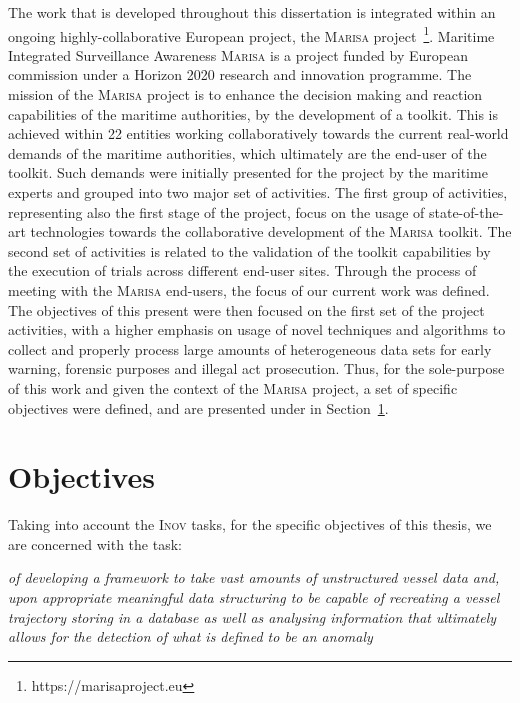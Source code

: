 The work that is developed throughout this dissertation  is integrated within an ongoing highly-collaborative European project, the \textsc{Marisa} project~\footnote{https://marisaproject.eu}. Maritime Integrated Surveillance Awareness \textsc{Marisa} is a project funded by European commission under a Horizon 2020 research and innovation programme. The mission of the \textsc{Marisa} project is to enhance the decision making and reaction capabilities of the maritime authorities, by the development of a toolkit. 
This is achieved within 22 entities working collaboratively towards the current real-world demands of the maritime authorities, which ultimately are the end-user of the toolkit. Such demands were initially presented for the project by the maritime experts and grouped into two major set of activities. The first group of activities, representing also the first stage of the project, focus on the usage of state-of-the-art technologies towards the collaborative development of the \textsc{Marisa} toolkit. The second set of activities is related to the validation of the toolkit capabilities by the execution of trials across different end-user sites.  
Through the process of meeting with the \textsc{Marisa} end-users, the focus of our current work was defined. The objectives of this present were then focused on the first set of the project activities, with a higher emphasis on usage of novel techniques and algorithms to collect and properly process large amounts of heterogeneous data sets for early warning, forensic purposes and illegal act prosecution. Thus, for the sole-purpose of this work and given the context of the \textsc{Marisa} project, a set of specific objectives were defined, and are presented under in Section~\ref{section: thesis objectives}.

\section{Objectives}
\label{section: thesis objectives}
Taking into account the \textsc{Inov} tasks, for the specific objectives of this thesis, we are concerned with the task:

{\centering
\emph{
of developing a framework to take vast amounts of unstructured vessel data and, upon appropriate meaningful data structuring to be capable of recreating a vessel trajectory storing in a database as well as analysing information that ultimately allows for the detection of what is defined to be an anomaly}
}

